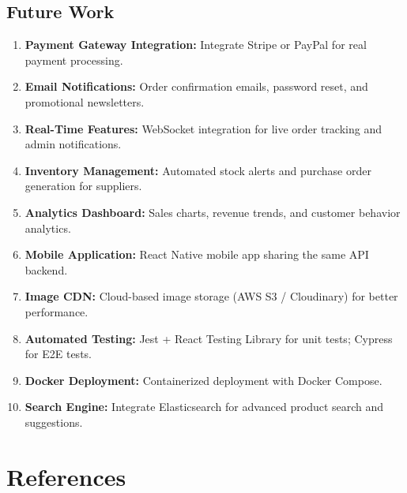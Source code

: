 \documentclass[12pt,a4paper]{report}
\begin{document}
\section{Future Work}
\begin{enumerate}[noitemsep]
  \item \textbf{Payment Gateway Integration:} Integrate Stripe or PayPal for real payment processing.
  \item \textbf{Email Notifications:} Order confirmation emails, password reset, and promotional newsletters.
  \item \textbf{Real-Time Features:} WebSocket integration for live order tracking and admin notifications.
  \item \textbf{Inventory Management:} Automated stock alerts and purchase order generation for suppliers.
  \item \textbf{Analytics Dashboard:} Sales charts, revenue trends, and customer behavior analytics.
  \item \textbf{Mobile Application:} React Native mobile app sharing the same API backend.
  \item \textbf{Image CDN:} Cloud-based image storage (AWS S3 / Cloudinary) for better performance.
  \item \textbf{Automated Testing:} Jest + React Testing Library for unit tests; Cypress for E2E tests.
  \item \textbf{Docker Deployment:} Containerized deployment with Docker Compose.
  \item \textbf{Search Engine:} Integrate Elasticsearch for advanced product search and suggestions.
\end{enumerate}


\chapter*{References}
\end{document}
